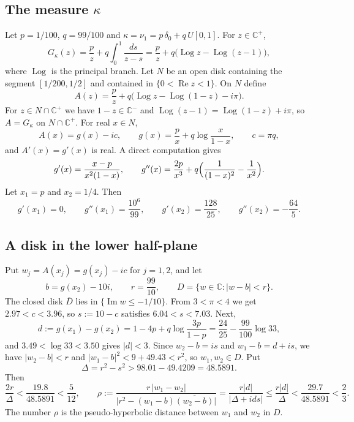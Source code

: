 \documentclass[11pt]{amsart}
\numberwithin{equation}{section}
\theoremstyle{definition}
\theoremstyle{remark}
\newcommand{\C}{\mathbb C}
\newcommand{\Cp}{\mathbb C^{+}}
\newcommand{\Cm}{\mathbb C^{-}}
\newcommand{\Log}{\operatorname{Log}}
\renewcommand{\Re}{\operatorname{Re}}
\renewcommand{\Im}{\operatorname{Im}}
\begin{document}
\subsection{\texorpdfstring{The measure $\kappa$}{The measure kappa}}
Let $p=1/100$, $q=99/100$ and $\kappa=\nu_1=p\,\delta_0+q\,U[0,1]$. For $z\in\Cp$,
\[
G_\kappa(z)=\frac pz+q\int_0^1\frac{ds}{z-s}=\frac pz+q\bigl(\Log z-\Log(z-1)\bigr),
\]
where $\Log$ is the principal branch. Let $N$ be an open disk containing the segment $[1/200,1/2]$ and contained in $\{0<\Re z<1\}$. On $N$ define
\[
A(z)=\frac pz+q\bigl(\Log z-\Log(1-z)-i\pi\bigr).
\]
For $z\in N\cap\Cp$ we have $1-z\in\Cm$ and $\Log(z-1)=\Log(1-z)+i\pi$, so $A=G_\kappa$ on $N\cap\Cp$. For real $x\in N$,
\begin{equation}\label{eq:Areal}
A(x)=g(x)-ic,\qquad g(x)=\frac px+q\log\frac{x}{1-x},\qquad c=\pi q,
\end{equation}
and $A'(x)=g'(x)$ is real. A direct computation gives
\begin{equation}\label{eq:gder}
g'(x)=\frac{x-p}{x^2(1-x)},\qquad g''(x)=\frac{2p}{x^3}+q\Bigl(\frac1{(1-x)^2}-\frac1{x^2}\Bigr).
\end{equation}
Let $x_1=p$ and $x_2=1/4$. Then
\begin{equation}\label{eq:gvalues}
g'(x_1)=0,\qquad g''(x_1)=\frac{10^6}{99},\qquad g'(x_2)=\frac{128}{25},\qquad g''(x_2)=-\frac{64}{5}.
\end{equation}

\subsection{A disk in the lower half-plane}
Put $w_j=A(x_j)=g(x_j)-ic$ for $j=1,2$, and let
\[
b=g(x_2)-10i,\qquad r=\frac{99}{10},\qquad D=\{w\in\C:|w-b|<r\}.
\]
The closed disk $\overline D$ lies in $\{\Im w\le-1/10\}$. From $3<\pi<4$ we get $2.97<c<3.96$, so $s:=10-c$ satisfies $6.04<s<7.03$. Next,
\[
d:=g(x_1)-g(x_2)=1-4p+q\log\frac{3p}{1-p}=\frac{24}{25}-\frac{99}{100}\log 33,
\]
and $3.49<\log33<3.50$ gives $|d|<3$. Since $w_2-b=is$ and $w_1-b=d+is$, we have $|w_2-b|<r$ and $|w_1-b|^2<9+49.43<r^2$, so $w_1,w_2\in D$. Put
\[
\Delta=r^2-s^2>98.01-49.4209=48.5891 .
\]
Then
\begin{equation}\label{eq:disk}
\frac{2r}{\Delta}<\frac{19.8}{48.5891}<\frac5{12},\qquad
\rho:=\frac{r\,|w_1-w_2|}{\bigl|r^2-(w_1-b)\overline{(w_2-b)}\bigr|}=\frac{r|d|}{|\Delta+ids|}\le\frac{r|d|}{\Delta}<\frac{29.7}{48.5891}<\frac23 .
\end{equation}
The number $\rho$ is the pseudo-hyperbolic distance between $w_1$ and $w_2$ in $D$.
\end{document}
